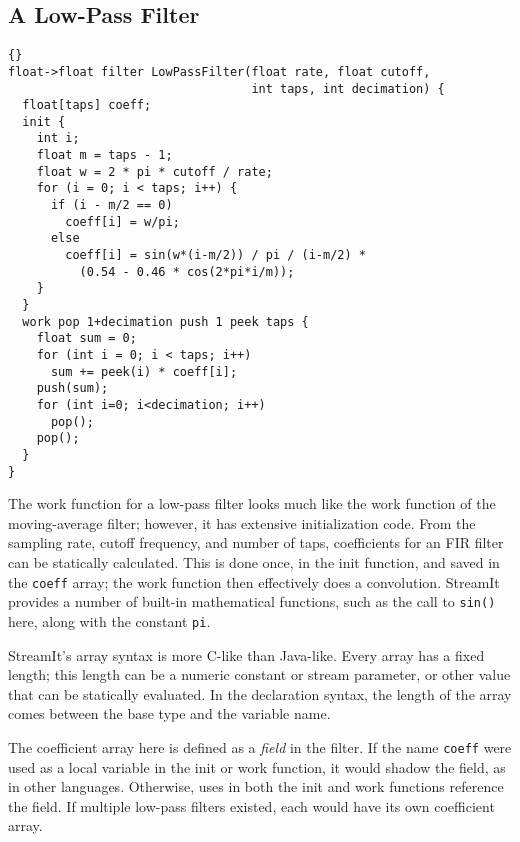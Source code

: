 \subsection{A Low-Pass Filter}

\begin{lstlisting}{}
float->float filter LowPassFilter(float rate, float cutoff, 
                                  int taps, int decimation) {
  float[taps] coeff;
  init {
    int i;
    float m = taps - 1;
    float w = 2 * pi * cutoff / rate;
    for (i = 0; i < taps; i++) {
      if (i - m/2 == 0)
        coeff[i] = w/pi;
      else
        coeff[i] = sin(w*(i-m/2)) / pi / (i-m/2) *
          (0.54 - 0.46 * cos(2*pi*i/m));
    }
  }
  work pop 1+decimation push 1 peek taps {
    float sum = 0;
    for (int i = 0; i < taps; i++)
      sum += peek(i) * coeff[i];
    push(sum);
    for (int i=0; i<decimation; i++)
      pop();
    pop();
  }
}
\end{lstlisting}

The work function for a low-pass filter looks much like the work
function of the moving-average filter; however, it has extensive
initialization code.  From the sampling rate, cutoff frequency, and
number of taps, coefficients for an FIR filter can be statically
calculated.  This is done once, in the init function, and saved in the
\lstinline|coeff| array; the work function then effectively does a
convolution.  StreamIt provides a number of built-in mathematical
functions, such as the call to \lstinline|sin()| here, along with
the constant \lstinline|pi|.

StreamIt's array syntax is more C-like than Java-like.  Every array
has a fixed length; this length can be a numeric constant or stream
parameter, or other value that can be statically evaluated.  In the
declaration syntax, the length of the array comes between the base
type and the variable name.

The coefficient array here is defined as a \emph{field} in the
filter.  If the name \lstinline|coeff| were used as a local variable
in the init or work function, it would shadow the field, as in other
languages.  Otherwise, uses in both the init and work functions
reference the field.  If multiple low-pass filters existed, each would
have its own coefficient array.
